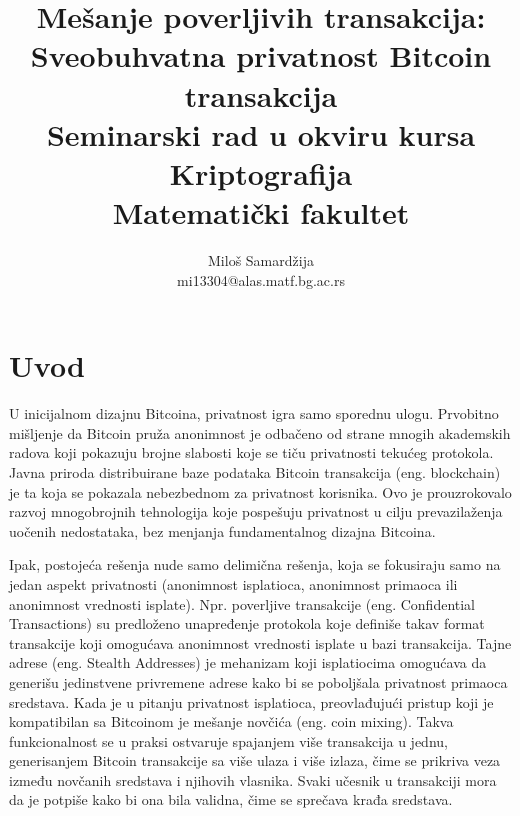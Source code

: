 \documentclass[a4paper]{article}
\begin{document}
\title{Mešanje poverljivih transakcija: Sveobuhvatna privatnost Bitcoin transakcija\\ \small{Seminarski rad u okviru kursa\\Kriptografija\\ Matematički fakultet}}

\author{Miloš Samardžija\\mi13304@alas.matf.bg.ac.rs}

\maketitle

\tableofcontents

\newpage

\section{Uvod}
\label{sec:uvod}
U inicijalnom dizajnu Bitcoina, privatnost igra samo sporednu ulogu. Prvobitno mišljenje da Bitcoin pruža anonimnost je odbačeno od strane mnogih akademskih radova koji pokazuju brojne slabosti koje se tiču privatnosti tekućeg protokola. Javna priroda distribuirane baze podataka Bitcoin transakcija (eng. blockchain) je ta koja se pokazala nebezbednom za privatnost korisnika. Ovo je prouzrokovalo razvoj mnogobrojnih tehnologija koje pospešuju privatnost u cilju prevazilaženja uočenih nedostataka, bez menjanja fundamentalnog dizajna Bitcoina.

Ipak, postojeća rešenja nude samo delimična rešenja, koja se fokusiraju samo na jedan aspekt privatnosti (anonimnost isplatioca, anonimnost primaoca ili anonimnost vrednosti isplate). Npr. poverljive transakcije (eng. Confidential Transactions) su predloženo unapređenje protokola koje definiše takav format transakcije koji omogućava anonimnost vrednosti isplate u bazi transakcija. Tajne adrese (eng. Stealth Addresses) je mehanizam koji isplatiocima omogućava da generišu jedinstvene privremene adrese kako bi se poboljšala privatnost primaoca sredstava. Kada je u pitanju privatnost isplatioca, preovlađujući pristup koji je kompatibilan sa Bitcoinom je mešanje novčića (eng. coin mixing). Takva funkcionalnost se u praksi ostvaruje spajanjem više transakcija u jednu, generisanjem Bitcoin transakcije sa više ulaza i više izlaza, čime se prikriva veza između novčanih sredstava i njihovih vlasnika. Svaki učesnik u transakciji mora da je potpiše kako bi ona bila validna, čime se sprečava krađa sredstava.
\end{document}
